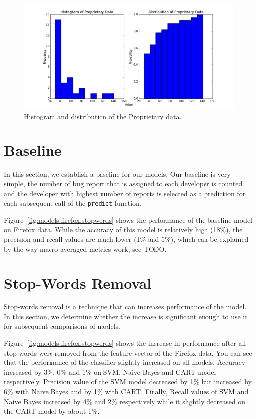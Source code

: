 \begin{figure}[htbp]
    \centering
        \includegraphics[width=\textwidth]{./images/distribution/proprietary.png}
    \caption{Histogram and distribution of the Proprietary data.}
    \label{fig:datasets.proprietary.dist}
\end{figure}

\section{Baseline}

In this section, we establish a baseline for our models. Our baseline is very simple, the number of bug report that is assigned to each developer is counted and the developer with highest number of reports is selected as a prediction for each subsequent call of the \texttt{predict} function.

Figure~\ref{fig:models.firefox.stopwords} shows the performance of the baseline model on Firefox data. While the accuracy of this model is relatively high (18\%), the precision and recall values are much lower (1\% and 5\%), which can be explained by the way macro-averaged metrics work, see TODO. 

\section{Stop-Words Removal}

Stop-words removal is a technique that can increases performance of the model. In this section, we determine whether the increase is significant enough to use it for subsequent comparisons of models.

Figure~\ref{fig:models.firefox.stopwords} shows the increase in performance after all stop-words were removed from the feature vector of the Firefox data. You can see that the performance of the classifier slightly increased on all models. Accuracy increased by 3\%, 0\% and 1\% on SVM, Naive Bayes and CART model respectively. Precision value of the SVM model decreased by 1\% but increased by 6\% with Naive Bayes and by 1\% with CART. Finally, Recall values of SVM and Naive Bayes increased by 4\% and 2\% respectively while it slightly decreased on the CART model by about 1\%.

